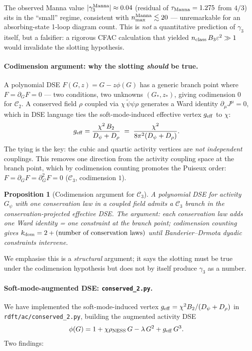 \documentclass[10pt,a4paper,twocolumn]{article}
\theoremstyle{plain}
\newtheorem{proposition}[theorem]{Proposition}
\theoremstyle{definition}
\newcommand{\eps}{\varepsilon}
\newcommand{\Cstr}[1]{\mathcal{C}_{#1}}
\begin{document}
The observed Manna value $|\gamma_3^{\rm Manna}| \approx 0.04$ (residual
of $\tau_{\rm Manna} = 1.275$ from $4/3$) sits in the
``small'' regime, consistent with $n_{\max}^{\rm Manna} \lesssim 20$ ---
unremarkable for an absorbing-state 1-loop diagram count.  This is
\emph{not} a quantitative prediction of $\gamma_3$ itself, but a
falsifier: a rigorous CFAC calculation that yielded $n_{\rm class}\,B_3
\eps^2 \gg 1$ would invalidate the slotting hypothesis.

\paragraph{Codimension argument: why the slotting \emph{should} be true.}
A polynomial DSE $F(G,z) = G - z\phi(G)$ has a generic branch point
where $F = \partial_G F = 0$ --- two conditions, two unknowns
$(G_*, z_*)$, giving codimension $0$ for $\Cstr{2}$.
A conserved field $\rho$ coupled via $\chi\,\tilde\psi\psi\rho$
generates a Ward identity $\partial_\mu J^\mu = 0$, which in DSE
language ties the soft-mode-induced effective vertex $g_{\rm eff}$
to $\chi$:
\begin{equation}\label{eq:g_eff_tied}
  g_{\rm eff} = \frac{\chi^2\,B_2}{D_\psi + D_\rho}
  \;=\;\frac{\chi^2}{8\pi^2(D_\psi + D_\rho)}.
\end{equation}
The tying is the key: the cubic and quartic activity vertices are
\emph{not independent} couplings.  This removes one direction from
the activity coupling space at the branch point, which by codimension
counting promotes the Puiseux order:
$F = \partial_G F = \partial_G^2 F = 0$ ($\Cstr{3}$, codimension $1$).

\begin{proposition}[Codimension argument for $\Cstr{3}$]\label{prop:codim}
A polynomial DSE for activity $G_\psi$ with one conservation law in a
coupled field admits a $\Cstr{3}$ branch in the conservation-projected
effective DSE.  The argument: each conservation law adds one Ward
identity = one constraint at the branch point; codimension counting
gives $k_{\rm dom} = 2 + (\text{number of conservation laws})$ until
Banderier--Drmota dyadic constraints intervene.
\end{proposition}

We emphasise this is a \emph{structural} argument; it says the
slotting must be true under the codimension hypothesis but does not
by itself produce $\gamma_3$ as a number.

\paragraph{Soft-mode-augmented DSE: \texttt{conserved\_2.py}.}
We have implemented the soft-mode-induced vertex
$g_{\rm eff} = \chi^2 B_2/(D_\psi + D_\rho)$ in
\texttt{rdft/ac/conserved\_2.py}, building the augmented activity
DSE
\begin{equation}\label{eq:phi_augmented}
  \phi(G) = 1 + \chi\rho_{\rm NESS}\,G - \lambda\,G^2 + g_{\rm eff}\,G^3.
\end{equation}
Two findings:
\end{document}
